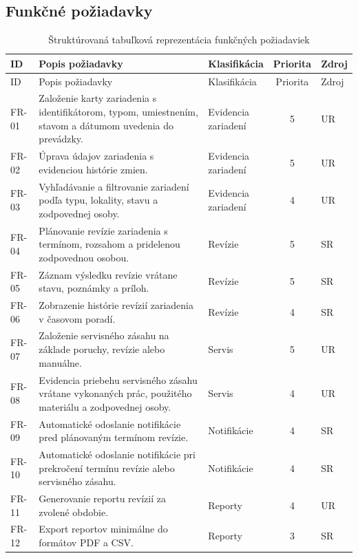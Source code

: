 \subsection{Funkčné požiadavky}

\small
\begin{longtable}{|p{1.3cm}|p{5.8cm}|p{2.0cm}|c|p{2.1cm}|}
\caption{Štruktúrovaná tabuľková reprezentácia funkčných požiadaviek}\label{tab:functional-requirements-structured}\\
\hline
ID & Popis požiadavky & Klasifikácia & Priorita & Zdroj \\
\hline
\endfirsthead
\hline
ID & Popis požiadavky & Klasifikácia & Priorita & Zdroj \\
\hline
\endhead
FR-01 & Založenie karty zariadenia s identifikátorom, typom, umiestnením, stavom a dátumom uvedenia do prevádzky. & \shortstack[l]{Evidencia\\zariadení} & 5 & UR \\
\hline
FR-02 & Úprava údajov zariadenia s evidenciou histórie zmien. & \shortstack[l]{Evidencia\\zariadení} & 5 & UR \\
\hline
FR-03 & Vyhľadávanie a filtrovanie zariadení podľa typu, lokality, stavu a zodpovednej osoby. & \shortstack[l]{Evidencia\\zariadení} & 4 & UR \\
\hline
FR-04 & Plánovanie revízie zariadenia s termínom, rozsahom a pridelenou zodpovednou osobou. & Revízie & 5 & SR \\
\hline
FR-05 & Záznam výsledku revízie vrátane stavu, poznámky a príloh. & Revízie & 5 & SR \\
\hline
FR-06 & Zobrazenie histórie revízií zariadenia v časovom poradí. & Revízie & 4 & SR \\
\hline
FR-07 & Založenie servisného zásahu na základe poruchy, revízie alebo manuálne. & Servis & 5 & UR \\
\hline
FR-08 & Evidencia priebehu servisného zásahu vrátane vykonaných prác, použitého materiálu a zodpovednej osoby. & Servis & 4 & UR \\
\hline
FR-09 & Automatické odoslanie notifikácie pred plánovaným termínom revízie. & Notifikácie & 4 & SR \\
\hline
FR-10 & Automatické odoslanie notifikácie pri prekročení termínu revízie alebo servisného zásahu. & Notifikácie & 4 & SR \\
\hline
FR-11 & Generovanie reportu revízií za zvolené obdobie. & Reporty & 4 & UR \\
\hline
FR-12 & Export reportov minimálne do formátov PDF a CSV. & Reporty & 3 & SR \\
\hline
\end{longtable}

